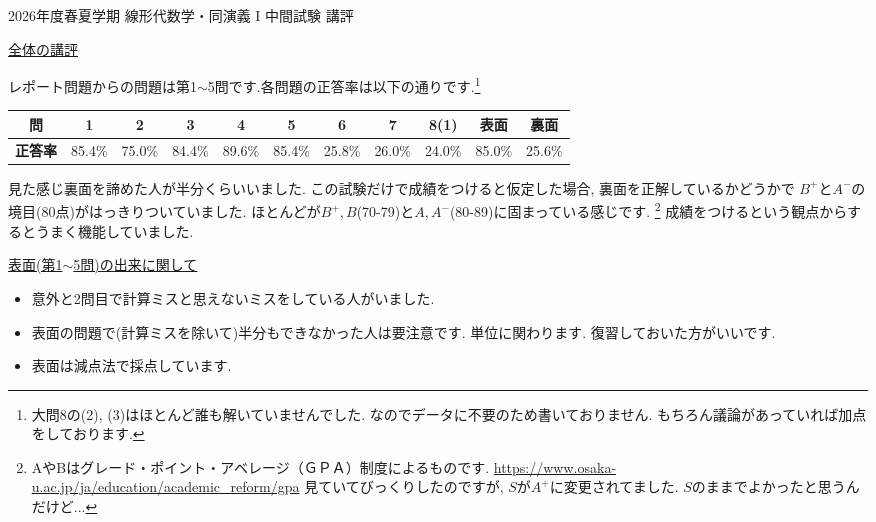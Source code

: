 \documentclass[uplatex,dvipdfmx,a4paper,14pt]{jsarticle}
\begin{document}
\begin{center}
{\Large 2026年度春夏学期 線形代数学・同演義 I 中間試験 講評}
\end{center}


{\large \underline{全体の講評}}

レポート問題からの問題は第1$\sim$5問です.各問題の正答率は以下の通りです.\footnote{大問8の(2), (3)はほとんど誰も解いていませんでした. なのでデータに不要のため書いておりません. もちろん議論があっていれば加点をしております.}

\begin{table}[htbp]
\centering
\begin{tabular}{c|cccccccccc}
\textbf{問} & 1 & 2 & 3 & 4 & 5 & 6 & 7 & 8(1)&表面& 裏面 \\
\hline
\textbf{正答率} & 85.4\% & 75.0\% & 84.4\% & 89.6\% & 85.4\% & 25.8\% & 26.0\% & 24.0\% & 85.0\% & 25.6\% 
\end{tabular}
\end{table}
  
 見た感じ裏面を諦めた人が半分くらいいました. 
この試験だけで成績をつけると仮定した場合, 裏面を正解しているかどうかで $B^{+}$と$A^{-}$の境目(80点)がはっきりついていました. ほとんどが$B^+, B$(70-79)と$A, A^{-}$(80-89)に固まっている感じです. \footnote{AやBはグレード・ポイント・アベレージ（ＧＰＡ）制度によるものです. \url{https://www.osaka-u.ac.jp/ja/education/academic_reform/gpa} 見ていてびっくりしたのですが, $S$が$A^{+}$に変更されてました. $S$のままでよかったと思うんだけど...}
成績をつけるという観点からするとうまく機能していました. 
    \vspace{5pt}

{\large  \underline{表面(第1$\sim$5問)の出来に関して}}

\begin{itemize}
\item 意外と2問目で計算ミスと思えないミスをしている人がいました. 
\item 表面の問題で(計算ミスを除いて)半分もできなかった人は要注意です. 単位に関わります. 復習しておいた方がいいです.
\item 表面は減点法で採点しています. 
\end{itemize}
\end{document}
